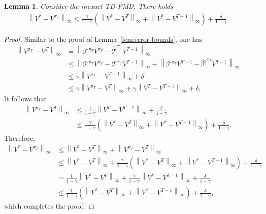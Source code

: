 \documentclass[10pt]{article}
\newcommand{\calT}{\mathcal{T}}
\newcommand{\ls}{\left}
\newcommand{\rs}{\right}
\theoremstyle{plain}
\newtheorem{lemma}[theorem]{Lemma}
\theoremstyle{definition}
\begin{document}
\begin{lemma} 
    Consider the inexact TD-PMD. There holds
    {
        \begin{align*}
        \ls\| V^*-V^{\pi_T}\rs\| _{\infty} \le \frac{1}{1-\gamma}\left( \ls\| V^*-V^T \rs\| _{\infty}+\ls\| V^*-V^{T-1}\rs\| _{\infty} \right) +\frac{\delta}{1-\gamma}.
    \end{align*}
    }
    \label{lem:inexact-policy-error-bounded-by-value-error}
\end{lemma}
\begin{proof}
    Similar to the proof of Lemma~\ref{lem:error-bounds}, one has
    \begin{align*}
        \ls\| V^{\pi_T} - V^T \rs\|_\infty &= \ls\| \calT^{\pi_T} V^{\pi_T} - \widehat{\calT}^{\pi_T} V^{T-1} \rs\|_\infty \\
        &\leq \ls\| \calT^{\pi_T}V^{\pi_T} - \calT^{\pi_T}V^{T-1} \rs\|_\infty + \ls\| \calT^{\pi_T}V^{T-1} - \widehat{\calT}^{\pi_T}V^{T-1} \rs\|_\infty \\
        &\leq \gamma \ls\| V^{\pi_T} - V^{T-1} \rs\|_\infty + \delta \\
        &\leq \gamma \ls\| V^{\pi_T} - V^T \rs\|_\infty + \gamma \ls\| V^T - V^{T-1} \rs\|_\infty + \delta.
    \end{align*}
    It follows that
    \begin{align*}
        \ls\| V^{\pi_T} - V^T \rs\|_\infty &\leq \frac{\gamma}{1-\gamma} \ls\| V^T - V^{T-1} \rs\|_\infty + \frac{\delta}{1-\gamma} \\
        &\leq \frac{\gamma}{1-\gamma} \ls( \ls\| V^* - V^{T} \rs\|_\infty + \ls\| V^* - V^{T-1} \rs\|_\infty \rs) + \frac{\delta}{1-\gamma}.
    \end{align*}
    Therefore,
    \begin{align*}
        \ls\| V^* - V^{\pi_T} \rs\|_\infty &\leq \ls\| V^* - V^{T} \rs\|_\infty + \ls\| V^{\pi_T} - V^T \rs\|_\infty \\
        &\leq \ls\| V^* - V^T \rs\|_\infty + \frac{\gamma}{1-\gamma} \ls( \ls\| V^* - V^{T} \rs\|_\infty + \ls\| V^* - V^{T-1} \rs\|_\infty \rs) + \frac{\delta}{1-\gamma} \\
        &= \frac{1}{1-\gamma} \ls\| V^* - V^{T} \rs\|_\infty + \frac{\gamma}{1-\gamma} \ls\| V^* - V^{T-1} \rs\|_\infty + \frac{\delta}{1-\gamma} \\
        &\leq \frac{1}{1-\gamma} \ls( \ls\| V^* - V^T \rs\|_\infty + \ls\| V^* - V^{T-1} \rs\|_\infty \rs) + \frac{\delta}{1-\gamma},
    \end{align*}
    which completes the proof.
\end{proof}
\end{document}
